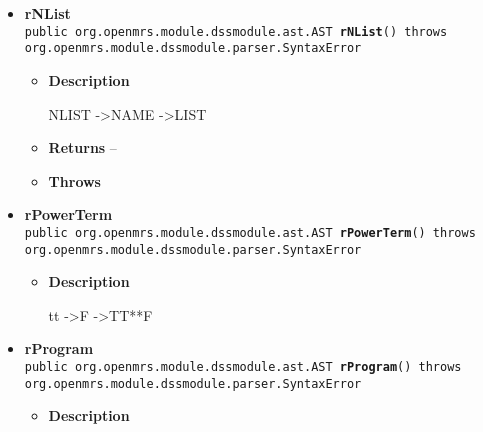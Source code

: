 {{{{{\begin{itemize}
{\begin{itemize}
{\texttt{\small
\mbox{}\newline \phantom{ }name\phantom{ }-\textgreater \phantom{ }}\mbox{}\newline
\texttt{\small \phantom{ }}

}
\item{{\bf  Returns} -- 
the id tree 
}%
\item{{\bf  Throws}
}%
\end{itemize}
}%
\item{ 
\hypertarget{org.openmrs.module.dssmodule.parser.Parser.rNList()}{{\bf  rNList}\\}
\texttt{public org.openmrs.module.dssmodule.ast.AST\ {\bf  rNList}() throws org.openmrs.module.dssmodule.parser.SyntaxError
\label{org.openmrs.module.dssmodule.parser.Parser.rNList()}}%
\begin{itemize}
\item{
{\bf  Description}

NLIST -\textgreater  NAME -\textgreater  LIST
}
\item{{\bf  Returns} -- 
 
}%
\item{{\bf  Throws}
}%
\end{itemize}
}%
\item{ 
\hypertarget{org.openmrs.module.dssmodule.parser.Parser.rPowerTerm()}{{\bf  rPowerTerm}\\}
\texttt{public org.openmrs.module.dssmodule.ast.AST\ {\bf  rPowerTerm}() throws org.openmrs.module.dssmodule.parser.SyntaxError
\label{org.openmrs.module.dssmodule.parser.Parser.rPowerTerm()}}%
\begin{itemize}
\item{
{\bf  Description}

tt -\textgreater  F -\textgreater  TT**F
}
\end{itemize}
}%
\item{ 
\hypertarget{org.openmrs.module.dssmodule.parser.Parser.rProgram()}{{\bf  rProgram}\\}
\texttt{public org.openmrs.module.dssmodule.ast.AST\ {\bf  rProgram}() throws org.openmrs.module.dssmodule.parser.SyntaxError
\label{org.openmrs.module.dssmodule.parser.Parser.rProgram()}}%
\begin{itemize}
\item{
{\bf  Description}

}
\end{itemize}}
\end{itemize}}}}}}
